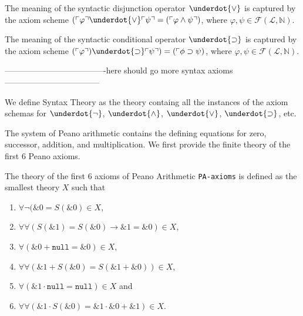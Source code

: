 \begin{definition}\label{def:Syntactic-Disj}
  \leanok
  The meaning of the syntactic disjunction operator $\underdot{\vee}$ is captured by the axiom scheme $(\ulcorner \varphi \urcorner \underdot{\vee} \ulcorner \psi \urcorner = (\ulcorner \varphi \wedge \psi \urcorner)$, where $\varphi, \psi \in \mathcal{F}(\mathcal{L},\mathbb{N})$.
\end{definition}

\begin{definition}\label{def:Syntactic-Cond}
  \leanok
  The meaning of the syntactic conditional operator $\underdot{\supset}$ is captured by the axiom scheme $(\ulcorner \varphi \urcorner) \underdot{\supset} \ulcorner \psi \urcorner) = (\ulcorner \phi \supset \psi)$, where $\varphi, \psi \in \mathcal{F}(\mathcal{L},\mathbb{N})$.
\end{definition}

-------------------------------------here should go more syntax axioms-----------------------------------

\begin{definition}\label{def:Syntax-Theory}
  \leanok
  We define Syntax Theory as the theory containg all the instances of the axiom schemas for $\underdot{\neg}$, $\underdot{\wedge}$, $\underdot{\vee}$, $\underdot{\supset}$, etc.
\end{definition}

The system of Peano arithmetic contains the defining equations for zero, successor, addition, and multiplication. We first provide the finite theory of the first 6 Peano axioms.
\begin{definition}\label{def:PA-Axioms}
  \leanok
    The theory of the first 6 axioms of Peano Arithmetic \texttt{PA-axioms} is defined as the smallest theory $X$ such that
    \begin{enumerate}
        \item $\forall \neg (\&0 = S(\&0) \in X$, 
        \item $\forall \forall (S(\&1) = S(\&0) \rightarrow \&1 = \&0) \in X$,
        \item $\forall (\&0 + \texttt{null} = \&0) \in X$,
        \item $\forall \forall (\&1 + S(\&0) = S(\&1 + \&0)) \in X$,
        \item $\forall (\&1 \cdot \texttt{null} = \texttt{null}) \in X$ and
        \item $\forall  \forall (\&1 \cdot S(\&0) = \&1 \cdot \&0 + \&1) \in X$.
    \end{enumerate}
\end{definition}

